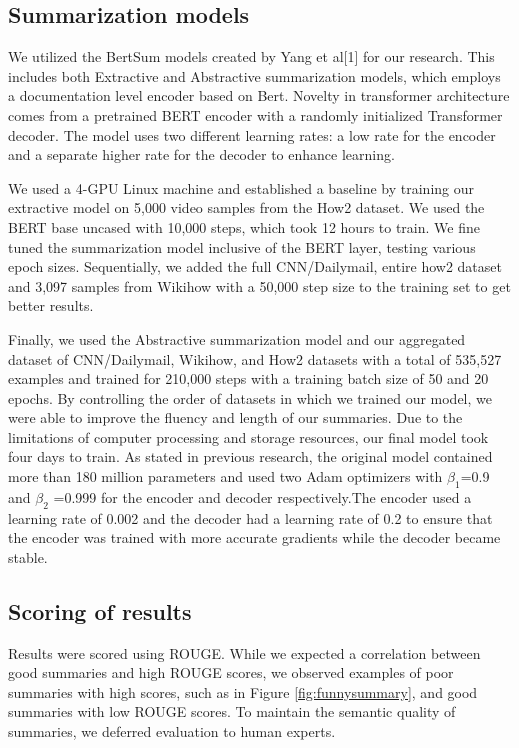 \documentclass{article}
\begin{document}
\subsection{Summarization models}

We utilized the BertSum models created by Yang et al[1] for our research. This includes both Extractive and Abstractive summarization models, which employs a documentation level encoder based on Bert. Novelty in transformer architecture comes from a pretrained BERT encoder with a randomly initialized Transformer decoder. The model uses two different learning rates: a low rate for the encoder and a separate higher rate for the decoder to enhance learning.

We used a 4-GPU Linux machine and established a baseline by training  our extractive model on 5,000 video samples from the How2 dataset.  We used the BERT base uncased with 10,000 steps, which took 12 hours to train. We fine tuned the summarization model inclusive of the BERT layer, testing various epoch sizes. Sequentially, we added the full CNN/Dailymail, entire how2 dataset and 3,097 samples from Wikihow with a 50,000 step size to the training set to get better results.

Finally, we used the Abstractive summarization model and our aggregated dataset of CNN/Dailymail, Wikihow, and How2 datasets with a total of 535,527 examples and trained for 210,000 steps with a training batch size of 50 and 20 epochs. By controlling the order of datasets in which we trained our model, we were able to improve the fluency and length of our summaries. Due to the limitations of computer processing and storage resources, our final model took four days to train. As stated in previous research, the original model contained more than 180 million parameters and used two Adam optimizers with $\beta_1$=0.9 and $\beta_2$ =0.999 for the encoder and decoder respectively.The encoder used a learning rate of 0.002 and the decoder had a learning rate of 0.2 to ensure that the encoder was trained with more accurate gradients while the decoder became stable.

\subsection{Scoring of results}
\label{Scoring}
Results were scored using ROUGE. While we expected a correlation between good summaries and high ROUGE scores, we observed examples of poor summaries with high scores, such as in Figure \ref{fig:funnysummary}, and good summaries with low ROUGE scores. To maintain the semantic quality of summaries, we deferred evaluation to human experts.
\end{document}
